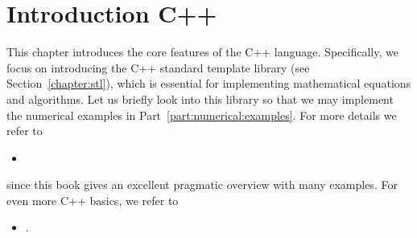 %




\chapter{Introduction C++}
This chapter introduces the core features of the C++ language. Specifically, we focus on introducing the C++ standard template library (see Section~\ref{chapter:stl}), which is essential for implementing mathematical equations and algorithms. Let us briefly look into this library so that we may implement the numerical examples in Part~\ref{part:numerical:examples}. For more details we refer to
\begin{itemize}
\item {}
\end{itemize}
since this book gives an excellent pragmatic overview with many examples. For even more C++ basics, we refer to
\begin{itemize}
\item {}.
\end{itemize}
